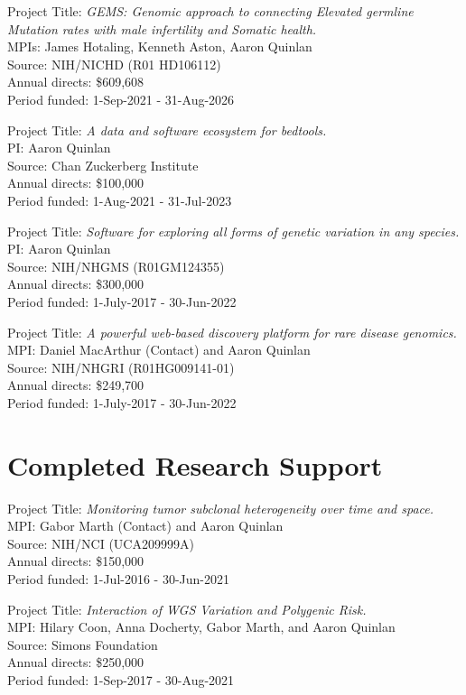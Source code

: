\documentclass[margin,line]{cv}
\begin{document}
\begin{resume}
    Project Title: \textit{GEMS: Genomic approach to connecting Elevated germline Mutation rates with male infertility and Somatic health.} \\
    MPIs: James Hotaling, Kenneth Aston, Aaron Quinlan \\
    Source: NIH/NICHD (R01 HD106112) \\
    Annual directs: \$609,608 \\
    Period funded: 1-Sep-2021 - 31-Aug-2026

    Project Title: \textit{A data and software ecosystem for bedtools.} \\
    PI: Aaron Quinlan \\
    Source: Chan Zuckerberg Institute \\
    Annual directs: \$100,000 \\
    Period funded: 1-Aug-2021 - 31-Jul-2023

    Project Title: \textit{Software for exploring all forms of genetic variation in any species.} \\
    PI: Aaron Quinlan \\
    Source: NIH/NHGMS (R01GM124355) \\
    Annual directs: \$300,000 \\
    Period funded: 1-July-2017 - 30-Jun-2022

    Project Title: \textit{A powerful web-based discovery platform for rare disease genomics.} \\
    MPI: Daniel MacArthur (Contact) and Aaron Quinlan \\
    Source: NIH/NHGRI (R01HG009141-01) \\
    Annual directs: \$249,700 \\
    Period funded: 1-July-2017 - 30-Jun-2022


    \section{\mysidestyle Completed Research Support}

    Project Title: \textit{Monitoring tumor subclonal heterogeneity over time and space.} \\
    MPI: Gabor Marth (Contact) and Aaron Quinlan \\
    Source: NIH/NCI (UCA209999A) \\
    Annual directs: \$150,000 \\
    Period funded: 1-Jul-2016 - 30-Jun-2021 

    Project Title: \textit{Interaction of WGS Variation and Polygenic Risk.} \\
    MPI: Hilary Coon, Anna Docherty, Gabor Marth, and Aaron Quinlan \\
    Source: Simons Foundation \\
    Annual directs: \$250,000 \\
    Period funded: 1-Sep-2017 - 30-Aug-2021 


\end{resume}
\end{document}
